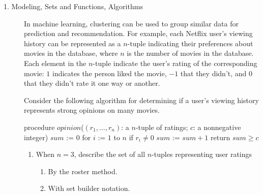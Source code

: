 \documentclass[12pt, oneside]{article}
\begin{document}
\begin{description}

\item[1. Modeling, Sets and Functions, Algorithms] 
In machine learning, clustering can be used to group similar data for prediction and recommendation.  For example,
each Netflix user's viewing history can be represented as a $n$-tuple indicating their preferences about
movies in the database, where $n$ is the number of movies in the database.  Each element in the $n$-tuple indicate
the user's rating of the corresponding movie: 
$1$ indicates the person liked the movie, $-1$
that they didn't, and $0$ that they didn't rate it one way or another.

Consider the following algorithm for determining if a user's viewing history represents
strong opinions on many movies.
\begin{algorithm}[caption={Determine if user's ratings tuple encode strong opinions}]
procedure $\textit{opinion}$($(r_1, \ldots, r_n)$: a $n$-tuple of ratings; $c$: a nonnegative integer)
$sum$ := $0$
for $i$ := $1$ to $n$
  if $r_i \neq 0$
    $sum$ := $sum + 1$
return $sum \geq c$
\end{algorithm}

  \begin{enumerate}\item When $n = 3$, describe the set of all $n$-tuples representing user ratings
  \begin{enumerate}\item By the roster method.
  
  \fi
  
  \item With set builder notation.
  
  \fi
  

\end{enumerate}
\end{enumerate}
\end{description}
\end{document}
